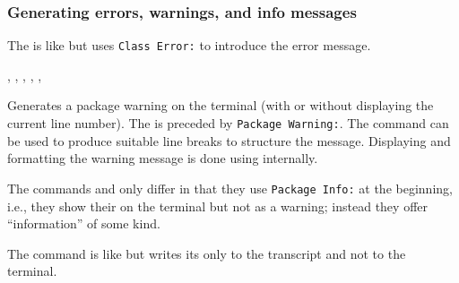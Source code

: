 \documentclass{l3in2edoc}
\begin{document}
\subsubsection{Generating errors, warnings, and info messages}





\begin{function}[]
  {
    \ClassError
  }
  \begin{syntax}
  \end{syntax}
  The  is like  but uses \texttt{Class
     Error:} to introduce the error message.
\end{function}




\begin{function}[]
  {
    \PackageWarning,
    \PackageWarningNoLine,
    \PackageNote,
    \PackageNoteNoLine,
    \PackageInfo,
  }
  \begin{syntax}
  \end{syntax}
  Generates a package warning on the terminal (with or without
  displaying the current line number). The  is preceded
  by \texttt{Package  Warning:}. The command
   can be used to produce suitable line breaks to
  structure the message.  Displaying and formatting the warning
  message is done using  internally.

  The commands  and  only differ
  in that they use \texttt{Package  Info:} at the
  beginning, i.e., they show their  on the terminal but
  not as a warning; instead they offer \enquote{information} of some
  kind.

  The command  is like  but writes its
   only to the transcript and not to the terminal.
\end{function}
\end{document}
